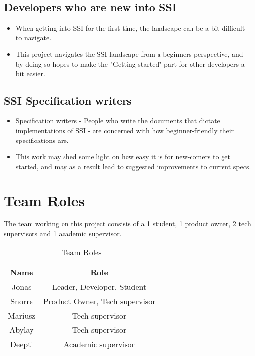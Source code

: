 \subsection{Developers who are new into SSI}
\begin{itemize}
\item When getting into SSI for the first time, the landscape can be a bit difficult to navigate.
\item This project navigates the SSI landscape from a beginners perspective, and by doing so hopes to make the "Getting started"-part for other developers a bit easier.
\end{itemize}

\subsection{SSI Specification writers}
\begin{itemize}
\item Specification writers - People who write the documents that dictate implementations of SSI - are concerned with how beginner-friendly their specifications are.
\item This work may shed some light on how easy it is for new-comers to get started, and may as a result lead to suggested improvements to current specs.
\end{itemize}



\section{Team Roles}

The team working on this project consists of a 1 student, 1 product owner, 2 tech supervisors and 1 academic supervisor.

\begin{table}
  \centering
  \caption{Team Roles}
  \label{tab:example1}
  \begin{tabular}{cc}
    \hline
    Name  & Role \\
    \hline
    Jonas       & Leader, Developer, Student         \\
    Snorre      & Product Owner, Tech supervisor \\
    Mariusz     & Tech supervisor \\
    Abylay      & Tech supervisor \\
    Deepti      & Academic supervisor \\
    \hline
  \end{tabular}
\end{table}


